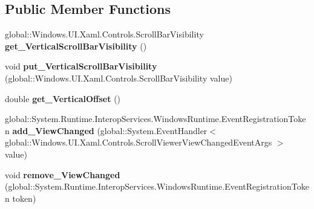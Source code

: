\subsection*{Public Member Functions}
\begin{DoxyCompactItemize}
\item 
\mbox{\label{class_windows_1_1_u_i_1_1_xaml_1_1_controls_1_1_scroll_viewer_ae2150cc90ac054e44b19688d45254504}} 
global\+::\+Windows.\+U\+I.\+Xaml.\+Controls.\+Scroll\+Bar\+Visibility {\bfseries get\+\_\+\+Vertical\+Scroll\+Bar\+Visibility} ()
\item 
\mbox{\label{class_windows_1_1_u_i_1_1_xaml_1_1_controls_1_1_scroll_viewer_a4ebc42955ec0b6a9d1bb937a99db8d5a}} 
void {\bfseries put\+\_\+\+Vertical\+Scroll\+Bar\+Visibility} (global\+::\+Windows.\+U\+I.\+Xaml.\+Controls.\+Scroll\+Bar\+Visibility value)
\item 
\mbox{\label{class_windows_1_1_u_i_1_1_xaml_1_1_controls_1_1_scroll_viewer_a19208c9fc6f7a5b20ce2809e891eaf0a}} 
double {\bfseries get\+\_\+\+Vertical\+Offset} ()
\item 
\mbox{\label{class_windows_1_1_u_i_1_1_xaml_1_1_controls_1_1_scroll_viewer_ac4976aefef665f53fb870e4ce8813d73}} 
global\+::\+System.\+Runtime.\+Interop\+Services.\+Windows\+Runtime.\+Event\+Registration\+Token {\bfseries add\+\_\+\+View\+Changed} (global\+::\+System.\+Event\+Handler$<$ global\+::\+Windows.\+U\+I.\+Xaml.\+Controls.\+Scroll\+Viewer\+View\+Changed\+Event\+Args $>$ value)
\item 
\mbox{\label{class_windows_1_1_u_i_1_1_xaml_1_1_controls_1_1_scroll_viewer_a317f11553250f27cac32f2a138b5c4b4}} 
void {\bfseries remove\+\_\+\+View\+Changed} (global\+::\+System.\+Runtime.\+Interop\+Services.\+Windows\+Runtime.\+Event\+Registration\+Token token)
\item 
\mbox{\label{class_windows_1_1_u_i_1_1_xaml_1_1_controls_1_1_scroll_viewer_a8696c8cbca169c5458cf7c1bc6e483a9}} 

\end{DoxyCompactItemize}
